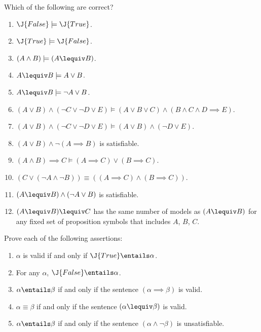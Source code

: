 \begin{iexercise}%
Which of the following are correct?
\begin{enumerate}
\item \(\J{False} \models \J{True}\). 
\item \(\J{True} \models \J{False}\). 
\item \((A\land B)  \models (A\lequiv B)\). 
\item \(A\lequiv B \models A \lor B\).
\item \(A\lequiv B \models \lnot A \lor B\).
\item \((A\lor B) \land (\lnot C\lor\lnot D\lor E) \models (A\lor B\lor C) \land (B\land C\land D\implies E)\).
\item \((A\lor B) \land (\lnot C\lor\lnot D\lor E) \models (A\lor B) \land (\lnot D\lor E)\).
\item \((A\lor B) \land \lnot(A \implies B)\) is satisfiable.
\item \((A\land B)\implies C \models (A\implies C)\lor(B\implies C)\).
\item \((C\lor (\lnot A \land \lnot B)) \equiv ((A\implies C) \land (B \implies C))\).
\item \((A\lequiv B) \land (\lnot A \lor B)\) is satisfiable.
\item \((A\lequiv B) \lequiv C\) has the same number of models as \((A\lequiv B)\) for any fixed
set of proposition symbols that includes \(A\), \(B\), \(C\).
\end{enumerate}
\end{iexercise} 

\begin{exercise}
Prove each of the following assertions:
\begin{enumerate}
\item \(\alpha\) is valid if and only if \(\J{True}\entails \alpha\).
\item For any \(\alpha\), \(\J{False}\entails\alpha\).
\item \(\alpha\entails \beta\) if and only if the sentence \((\alpha \implies \beta)\) is valid.
\item \(\alpha \equiv \beta\) if and only if the sentence \((\alpha\lequiv\beta)\) is valid.
\item \(\alpha\entails \beta\) if and only if the sentence \((\alpha \land \lnot \beta)\) is unsatisfiable.
\end{enumerate}
\end{exercise} 

